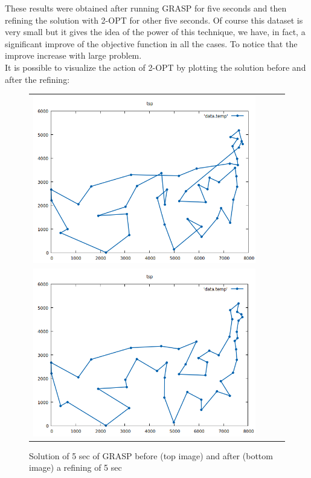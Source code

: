 \noindent These results were obtained after running GRASP for five seconds and then refining the solution with 2-OPT for other five seconds. Of course this dataset is very small but it gives the idea of the power of this technique, we have, in fact, a significant improve of the objective function in all the cases. To notice that the improve increase with large problem. \\
It is possible to visualize the action of 2-OPT by plotting the solution before and after the refining:

\begin{figure}[h!]
\centering
	\begin{tabular}{@{}cccc@{}}
		\includegraphics[scale=0.40]{media/before2opt.png} \\
		\includegraphics[scale=0.40]{media/after2opt.png} \\
	\end{tabular}
	\caption{Solution of 5 sec of GRASP before (top image) and after (bottom image) a refining of 5 sec}
\end{figure}


